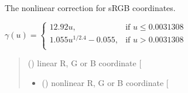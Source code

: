 \documentclass[letterpaper,10pt,english]{sphinxmanual}
\begin{document}
\begin{fulllineitems}
\label{\detokenize{07_colors:skinoptics.colors.nonlinear_corr_sRGB}}
\pysigstartsignatures
{}
\pysigstopsignatures
\sphinxAtStartPar
The nonlinear correction for sRGB coordinates.

\sphinxAtStartPar
\(\gamma(u) =  
\left \{ \begin{matrix}
12.92 u, & \mbox{if } u \le 0.0031308 \\
1.055 u^{1/2.4} - 0.055, & \mbox{if } u > 0.0031308 \\
\end{matrix} \right.\)
\begin{quote}\begin{description}
\sphinxAtStartPar
{} () \textendash{} linear R, G or B coordinate {[}\sphinxhyphen{}{]}

\sphinxAtStartPar
\begin{itemize}
\item {} 
\sphinxAtStartPar
{} () \textendash{} nonlinear R, G or B coordinate {[}\sphinxhyphen{}{]}

\end{itemize}


\end{description}\end{quote}

\end{fulllineitems}

\end{document}
